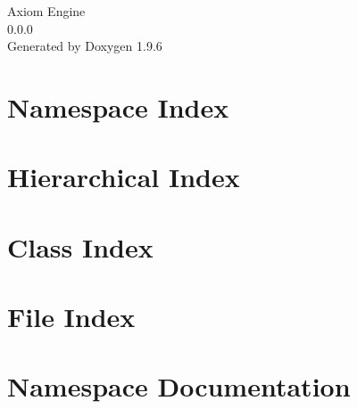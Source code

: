 \documentclass[twoside]{book}
\newcommand{\+}{\discretionary{\mbox{\scriptsize$\hookleftarrow$}}{}{}}
\newcommand{\clearemptydoublepage}{%
    \newpage{\pagestyle{empty}\cleardoublepage}%
  }
\begin{document}
  \raggedbottom
    \hypersetup{pageanchor=false,
                bookmarksnumbered=true,
                pdfencoding=unicode
               }
  \begin{titlepage}
  \vspace*{7cm}
  \begin{center}%
  {\Large Axiom Engine}\\
  [1ex]\large 0.\+0.\+0 \\
  \vspace*{1cm}
  {\large Generated by Doxygen 1.9.6}\\
  \end{center}
  \end{titlepage}
  \clearemptydoublepage
  \tableofcontents
  \clearemptydoublepage
  \hypersetup{pageanchor=true}
\chapter{Namespace Index}

\chapter{Hierarchical Index}

\chapter{Class Index}

\chapter{File Index}

\chapter{Namespace Documentation}














\end{document}
